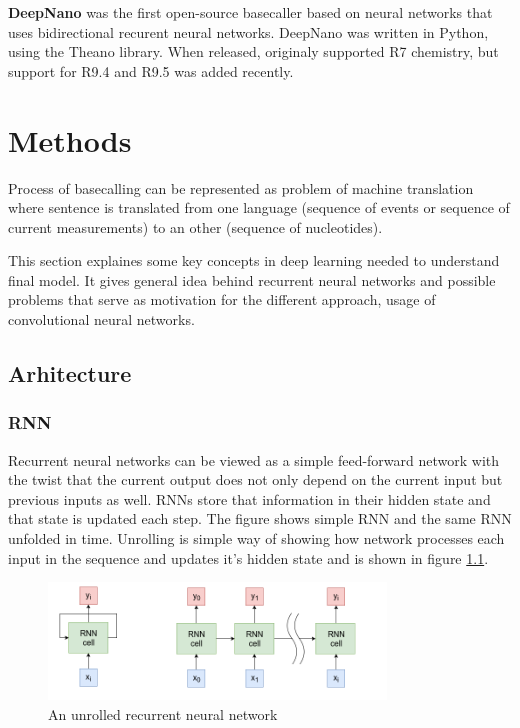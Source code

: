 \documentclass[times, utf8, diplomski, numeric, english]{fer}
\begin{document}
\textbf{DeepNano}\cite{Boza2017}  was the first open-source basecaller based on neural networks that uses bidirectional recurent neural networks. DeepNano was written in Python, using the Theano library. When released, originaly supported R7 chemistry, but support for R9.4 and R9.5 was added recently.

\chapter{Methods}
Process of basecalling can be represented as problem of machine translation where sentence is translated from one language (sequence of events or sequence of current measurements) to an other (sequence of nucleotides). 

This section explaines some key concepts in deep learning needed to understand final model. It gives general idea behind recurrent neural networks and possible problems that serve as motivation for the different approach, usage of convolutional neural networks. 

\section{Arhitecture}

\subsection{RNN}
Recurrent neural networks can be viewed as a simple feed-forward network with the twist that the current output does not only depend on the current input but previous inputs as well. RNNs store that information in their hidden state and that state is updated each step. The figure shows simple RNN and the same RNN unfolded in time.  Unrolling is simple way of showing how network processes each input in the sequence and updates it's hidden state and is shown in figure  \ref{fg:rnn}. 
\begin{figure}[!ht]
	\begin{center}
		\includegraphics[width=0.8\textwidth]{./imgs/rnn.png}
		\caption{An unrolled recurrent neural network}
		\label{fg:rnn}
	\end{center}
\end{figure}
\end{document}
